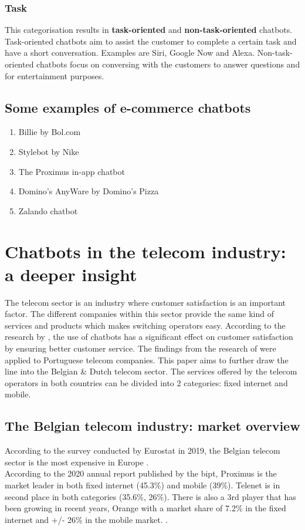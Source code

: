\subsubsection{Task}
This categorisation results in \textbf{task-oriented} and \textbf{non-task-oriented} chatbots. Task-oriented chatbots aim to assist the customer to complete a certain task and have a short conversation. Examples are Siri, Google Now and Alexa. Non-task-oriented chatbots focus on conversing with the customers to answer questions and for entertainment purposes. \citep{Nuruzzaman2018}

\subsection{Some examples of e-commerce chatbots}
\begin{enumerate}
	\setlength\itemsep{-0.1em}
	\item Billie by Bol.com
	\item Stylebot by Nike
	\item The Proximus in-app chatbot
	\item Domino's AnyWare by Domino's Pizza
	\item Zalando chatbot
\end{enumerate}

\section{Chatbots in the telecom industry: a deeper insight}
The telecom sector is an industry where customer satisfaction is an important factor. The different companies within this sector provide the same kind of services and products which makes switching operators easy. According to the research by \citep{Quintino2019}, the use of chatbots has a significant effect on customer satisfaction by ensuring better customer service. The findings from the research of \citeauthor{Quintino2019} were applied to Portuguese telecom companies. This paper aims to further draw the line into the Belgian \& Dutch telecom sector. The services offered by the telecom operators in both countries can be divided into 2 categories: fixed internet and mobile.

\subsection{The Belgian telecom industry: market overview}
According to the survey conducted by Eurostat in 2019, the Belgian telecom sector is the most expensive in Europe \citep{Eurostat2020}.\\
According to the 2020 annual report published by the \acrfull{bipt}, Proximus is the market leader in both fixed internet (45.3\%) and mobile (39\%). Telenet is in second place in both categories (35.6\%, 26\%). There is also a 3rd player that has been growing in recent years, Orange with a market share of 7.2\% in the fixed internet and +/- 26\% in the mobile market. \citep*{BIPT2021,VanLeemputten2021}.

